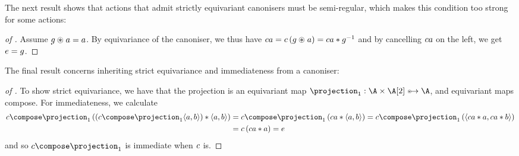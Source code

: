The next result shows that actions that admit strictly equivariant
canonisers must be semi-regular, which makes this condition too strong
for some actions:

\begin{proof}[of ]%
  Assume $g \act a = a$. By equivariance of the canoniser, we thus have
  $\canoniser a = \canoniser\parent{g \act a} = \canoniser a \mul \inv g$ and by cancelling
  $c a$ on the left, we get $\unit = g$.
\end{proof}

The final result concerns inheriting strict equivariance and
immediateness from a canoniser:

\begin{proof}[of ]%
  To show strict equivariance, we have that the projection is an equivariant map $\projection_1 : \A \times \B
  \equito \A$, and equivariant maps compose.
%
  For immediateness, we calculate
    \begin{align*}
    \canoniser\compose\projection_1\parent{(\canoniser\compose\projection_1{\pair ab})\mul{\pair ab}}
    &=
    \canoniser\compose\projection_1\parent{\canoniser a\mul{\pair ab}}
    =
    \canoniser\compose\projection_1\parent{\pair {\canoniser a\mul a}{\canoniser a\mul b}}
    \\&=
    \canoniser\parent{\canoniser{a} \mul a}
    =
    \unit
    \end{align*}
    and so $\canoniser \compose \projection_1$ is immediate when $c$ is.
\end{proof}
